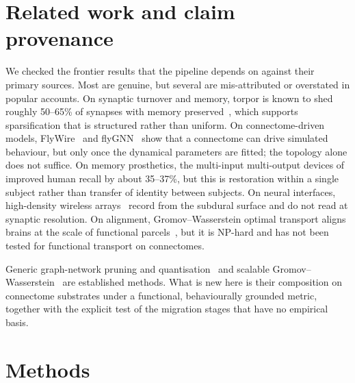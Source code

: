 \documentclass[11pt]{article}
\begin{document}
\section{Related work and claim provenance}
We checked the frontier results that the pipeline depends on against their primary sources. Most
are genuine, but several are mis-attributed or overstated in popular accounts. On synaptic
turnover and memory, torpor is known to shed roughly 50--65\% of synapses with memory
preserved~\citep{vonderohe2006torpor}, which supports sparsification that is structured rather
than uniform. On connectome-driven models, FlyWire~\citep{dorkenwald2024flywire} and
flyGNN~\citep{flygnn2025} show that a connectome can drive simulated behaviour, but only once the
dynamical parameters are fitted; the topology alone does not suffice. On memory prosthetics, the
multi-input multi-output devices of \citet{hampson2018prosthetic} improved human recall by about
35--37\%, but this is restoration within a single subject rather than transfer of identity between
subjects. On neural interfaces, high-density wireless arrays~\citep{jung2025bisc} record from the
subdural surface and do not read at synaptic resolution. On alignment, Gromov--Wasserstein optimal
transport aligns brains at the scale of functional parcels~\citep{thual2022fugw,xu2019gwl}, but it
is NP-hard and has not been tested for functional transport on connectomes.

Generic graph-network pruning and quantisation~\citep{gnnprunequant2025} and scalable
Gromov--Wasserstein~\citep{xu2019sgwl} are established methods. What is new here is their
composition on connectome substrates under a functional, behaviourally grounded metric, together
with the explicit test of the migration stages that have no empirical basis.

\section{Methods}
\end{document}
